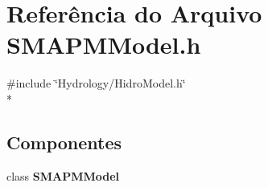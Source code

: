 \section{Referência do Arquivo S\+M\+A\+P\+M\+Model.\+h}
\label{_s_m_a_p_m_model_8h}
{\ttfamily \#include \char`\"{}Hydrology/\+Hidro\+Model.\+h\char`\"{}}\\*
\subsection*{Componentes}
\begin{DoxyCompactItemize}
\item 
class {\bf S\+M\+A\+P\+M\+Model}
\end{DoxyCompactItemize}
